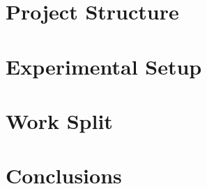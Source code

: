 \documentclass{article}
\begin{document}
\section{Project Structure}


\section{Experimental Setup}


\section{Work Split}


\section{Conclusions}

\end{document}
